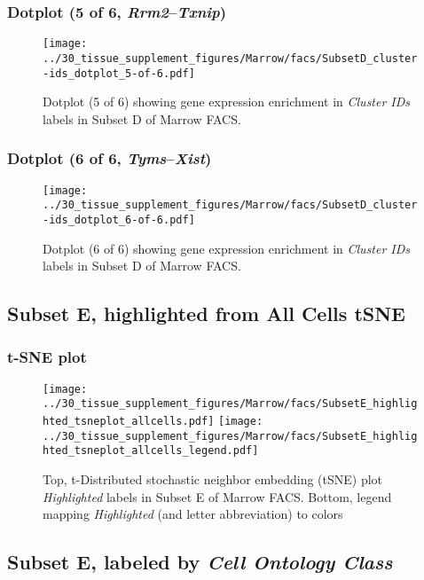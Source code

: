 \clearpage

\subsubsection{Dotplot (5 of 6, \emph{Rrm2}--\emph{Txnip})}
\begin{figure}[h]
\centering
\texttt{[image: ../30\_tissue\_supplement\_figures/Marrow/facs/SubsetD\_cluster-ids\_dotplot\_5-of-6.pdf]}

\caption{ Dotplot (5 of 6)  showing gene expression enrichment in \emph{Cluster IDs} labels in Subset D of Marrow FACS. }
\end{figure}


\clearpage

\subsubsection{Dotplot (6 of 6, \emph{Tyms}--\emph{Xist})}
\begin{figure}[h]
\centering
\texttt{[image: ../30\_tissue\_supplement\_figures/Marrow/facs/SubsetD\_cluster-ids\_dotplot\_6-of-6.pdf]}

\caption{ Dotplot (6 of 6)  showing gene expression enrichment in \emph{Cluster IDs} labels in Subset D of Marrow FACS. }
\end{figure}


\clearpage
\subsection{Subset E, highlighted from All Cells tSNE}
\subsubsection{t-SNE plot}
\begin{figure}[h]
\centering
\texttt{[image: ../30\_tissue\_supplement\_figures/Marrow/facs/SubsetE\_highlighted\_tsneplot\_allcells.pdf]}
\texttt{[image: ../30\_tissue\_supplement\_figures/Marrow/facs/SubsetE\_highlighted\_tsneplot\_allcells\_legend.pdf]}
\caption{Top, t-Distributed stochastic neighbor embedding (tSNE) plot  \emph{Highlighted} labels in Subset E of Marrow FACS. Bottom, legend mapping \emph{Highlighted} (and letter abbreviation) to colors}
\end{figure}


\clearpage

\subsection{Subset E, labeled by \emph{Cell Ontology Class}}
